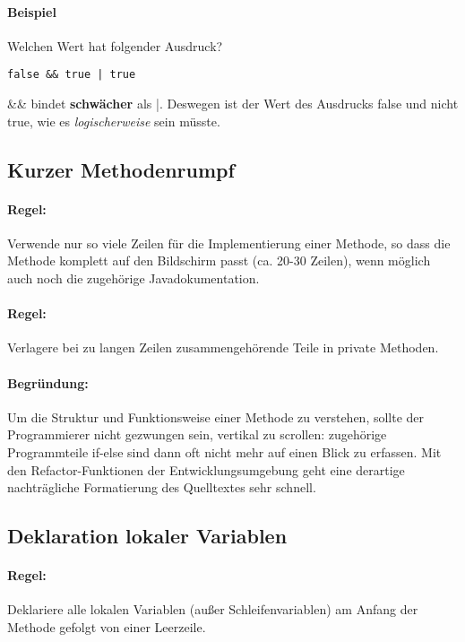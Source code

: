 \paragraph{Beispiel} Welchen Wert hat folgender Ausdruck?\par

\begin{lstlisting}
false && true | true
\end{lstlisting}

\&\& bindet \textbf{schwächer} als |. Deswegen ist der Wert des Ausdrucks false und nicht true, wie es \textit{logischerweise} sein müsste.

\subsection{Kurzer Methodenrumpf}

\paragraph{Regel:} Verwende nur so viele Zeilen für die Implementierung einer Methode, so dass die Methode komplett auf den Bildschirm passt (ca. 20-30 Zeilen), wenn möglich auch noch die zugehörige Javadokumentation.
\paragraph{Regel:} Verlagere bei zu langen Zeilen zusammengehörende Teile in private Methoden.
\paragraph{Begründung:} Um die Struktur und Funktionsweise einer Methode zu verstehen, sollte der Programmierer nicht gezwungen sein, vertikal zu scrollen: zugehörige Programmteile if-else sind dann oft nicht mehr auf einen Blick zu erfassen. Mit den Refactor-Funktionen der Entwicklungsumgebung geht eine derartige nachträgliche Formatierung des Quelltextes sehr schnell.

\subsection{Deklaration lokaler Variablen}

\paragraph{Regel:} Deklariere alle lokalen Variablen (außer Schleifenvariablen) am Anfang der Methode gefolgt von einer Leerzeile.
